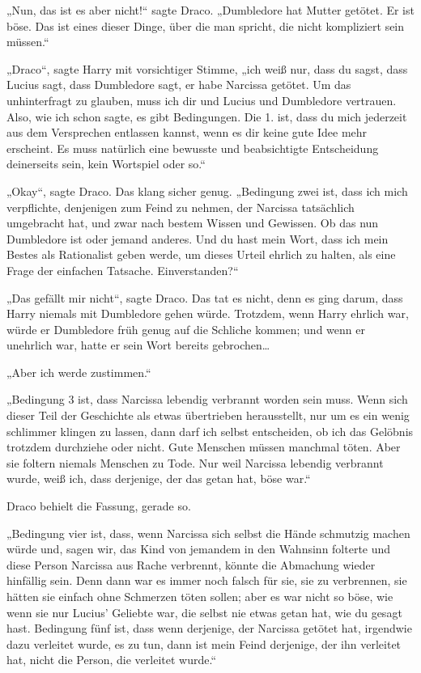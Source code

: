 {„Nun, das ist es aber nicht!“ sagte Draco. „Dumbledore hat Mutter getötet. Er ist böse. Das ist eines dieser Dinge, über die man spricht, die nicht kompliziert sein müssen.“

„Draco“, sagte Harry mit vorsichtiger Stimme, „ich weiß nur, dass du sagst, dass Lucius sagt, dass Dumbledore sagt, er habe Narcissa getötet. Um das unhinterfragt zu glauben, muss ich dir und Lucius und Dumbledore vertrauen. Also, wie ich schon sagte, es gibt Bedingungen. Die 1. ist, dass du mich jederzeit aus dem Versprechen entlassen kannst, wenn es dir keine gute Idee mehr erscheint. Es muss natürlich eine bewusste und beabsichtigte Entscheidung deinerseits sein, kein Wortspiel oder so.“

„Okay“, sagte Draco. Das klang sicher genug. „Bedingung zwei ist, dass ich mich verpflichte, denjenigen zum Feind zu nehmen, der Narcissa tatsächlich umgebracht hat, und zwar nach bestem Wissen und Gewissen. Ob das nun Dumbledore ist oder jemand anderes. Und du hast mein Wort, dass ich mein Bestes als Rationalist geben werde, um dieses Urteil ehrlich zu halten, als eine Frage der einfachen Tatsache. Einverstanden?“

„Das gefällt mir nicht“, sagte Draco. Das tat es nicht, denn es ging darum, dass Harry niemals mit Dumbledore gehen würde. Trotzdem, wenn Harry ehrlich war, würde er Dumbledore früh genug auf die Schliche kommen; und wenn er unehrlich war, hatte er sein Wort bereits gebrochen…

„Aber ich werde zustimmen.“

„Bedingung 3 ist, dass Narcissa lebendig verbrannt worden sein muss. Wenn sich dieser Teil der Geschichte als etwas übertrieben herausstellt, nur um es ein wenig schlimmer klingen zu lassen, dann darf ich selbst entscheiden, ob ich das Gelöbnis trotzdem durchziehe oder nicht. Gute Menschen müssen manchmal töten. Aber sie foltern niemals Menschen zu Tode. Nur weil Narcissa lebendig verbrannt wurde, weiß ich, dass derjenige, der das getan hat, böse war.“

Draco behielt die Fassung, gerade so.

„Bedingung vier ist, dass, wenn Narcissa sich selbst die Hände schmutzig machen würde und, sagen wir, das Kind von jemandem in den Wahnsinn folterte und diese Person Narcissa aus Rache verbrennt, könnte die Abmachung wieder hinfällig sein. Denn dann war es immer noch falsch für sie, sie zu verbrennen, sie hätten sie einfach ohne Schmerzen töten sollen; aber es war nicht so böse, wie wenn sie nur Lucius' Geliebte war, die selbst nie etwas getan hat, wie du gesagt hast. Bedingung fünf ist, dass wenn derjenige, der Narcissa getötet hat, irgendwie dazu verleitet wurde, es zu tun, dann ist mein Feind derjenige, der ihn verleitet hat, nicht die Person, die verleitet wurde.“

}
